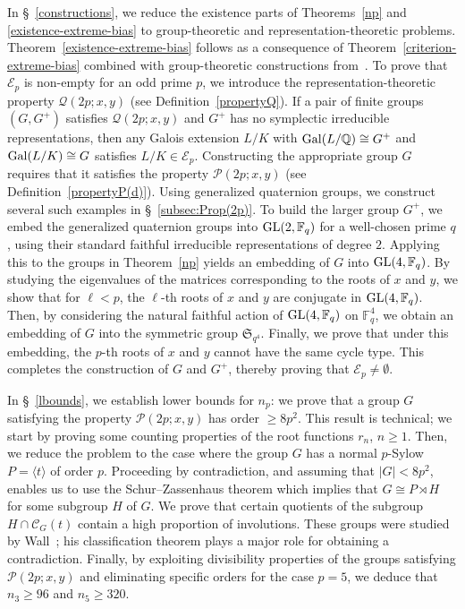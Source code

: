 \documentclass[12pt]{amsart}
\numberwithin{equation}{section}
\newcommand{\Gal}{{\rm Gal}}
\newcommand{\GL}{{\rm GL}}
\newcommand{\Q}{\mathbb Q}
\newcommand{\F}{\mathbb F}
\theoremstyle{definition}
\theoremstyle{remark}
\begin{document}
In \S~\ref{constructions}, we reduce the existence parts of Theorems~\ref{np} and \ref{existence-extreme-bias} to group-theoretic and representation-theoretic problems. Theorem~\ref{existence-extreme-bias} follows as a consequence of Theorem~\ref{criterion-extreme-bias} combined with group-theoretic constructions from~\cite{Hay}. To prove that $\mathcal{E}_p$ is non-empty for an odd prime $p$, we introduce the representation-theoretic property $\mathcal{Q}(2p;x,y)$ (see Definition~\ref{propertyQ}). If a pair of finite groups $(G,G^+)$ satisfies $\mathcal{Q}(2p;x,y)$ and $G^+$ has no symplectic irreducible representations, then any Galois extension $L/K$ with $\Gal(L/\Q) \cong G^+$ and $\Gal(L/K) \cong G$ satisfies $L/K\in \mathcal{E}_p$. Constructing the appropriate group $G$ requires that it satisfies the property $\mathcal{P}(2p;x,y)$ (see Definition~\ref{propertyP(d)}). Using generalized quaternion groups, we construct several such examples in \S~\ref{subsec:Prop(2p)}. To build the larger group $G^+$, we embed the generalized quaternion groups into $\GL(2,\F_q)$ for a well-chosen prime $q$, using their standard faithful irreducible representations of degree $2$. Applying this to the groups in Theorem~\ref{np} yields an embedding of $G$ into $\GL(4,\F_q)$. By studying the eigenvalues of the matrices corresponding to the roots of $x$ and $y$, we show that for $\ell<p$, the $\ell$-th roots of $x$ and $y$ are conjugate in $\GL(4,\F_q)$. Then, by considering the natural faithful action of $\GL(4,\F_q)$ on $\F_q^4$, we obtain an embedding of $G$ into the symmetric group $\mathfrak{S}_{q^4}$. Finally, we prove that under this embedding, the $p$-th roots of $x$ and $y$ cannot have the same cycle type. This completes the construction of $G$ and $G^+$, thereby proving that $\mathcal{E}_p \ne \emptyset$.

In \S~\ref{lbounds}, we establish lower bounds for $n_p$: we prove that a group $G$ satisfying the property $\mathcal{P}(2p;x,y)$ has order $\ge 8p^2$. This result is technical; we start by proving some counting properties of the root functions $r_n$, $n\ge1$. Then, we reduce the problem to the case where the group $G$ has a normal $p$-Sylow $P=\langle t\rangle$ of order $p$. Proceeding by contradiction, and assuming that $|G|<8p^2$, enables us to use the Schur--Zassenhaus theorem which implies that $G\cong P \rtimes H$ for some subgroup $H$ of $G$. We prove that certain quotients of the subgroup $H\cap \mathcal{C}_G(t)$ contain a high proportion of involutions. These groups were studied by Wall~\cite{Wall}; his classification theorem plays a major role for obtaining a contradiction. Finally, by exploiting divisibility properties of the groups satisfying $\mathcal{P}(2p;x,y)$ and eliminating specific orders for the case $p=5$, we deduce that $n_3\ge 96$ and $n_5\ge 320$.
\end{document}
